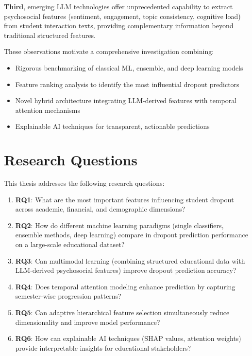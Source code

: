 \textbf{Third}, emerging LLM technologies offer unprecedented capability to extract psychosocial features (sentiment, engagement, topic consistency, cognitive load) from student interaction texts, providing complementary information beyond traditional structured features.

These observations motivate a comprehensive investigation combining:
\begin{itemize}
    \item Rigorous benchmarking of classical ML, ensemble, and deep learning models
    \item Feature ranking analysis to identify the most influential dropout predictors
    \item Novel hybrid architecture integrating LLM-derived features with temporal attention mechanisms
    \item Explainable AI techniques for transparent, actionable predictions
\end{itemize}

\section{Research Questions}

This thesis addresses the following research questions:

\begin{enumerate}
    \item \textbf{RQ1}: What are the most important features influencing student dropout across academic, financial, and demographic dimensions?
    
    \item \textbf{RQ2}: How do different machine learning paradigms (single classifiers, ensemble methods, deep learning) compare in dropout prediction performance on a large-scale educational dataset?
    
    \item \textbf{RQ3}: Can multimodal learning (combining structured educational data with LLM-derived psychosocial features) improve dropout prediction accuracy?
    
    \item \textbf{RQ4}: Does temporal attention modeling enhance prediction by capturing semester-wise progression patterns?
    
    \item \textbf{RQ5}: Can adaptive hierarchical feature selection simultaneously reduce dimensionality and improve model performance?
    
    \item \textbf{RQ6}: How can explainable AI techniques (SHAP values, attention weights) provide interpretable insights for educational stakeholders?
\end{enumerate}


